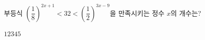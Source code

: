 부등식 $\left(\dfrac{1}{8}\right)^{2x+1}<32<\left(\dfrac{1}{2}\right)^{3x-9}$을 만족시키는 정수 $x$의 개수는?
\begin{choices32}{$1$}{$2$}{$3$}{$4$}{$5$}\end{choices32}

